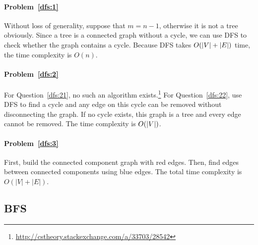 \begin{Answer}

\paragraph{Problem~\ref{dfs:1}}
Without loss of generality, suppose that $m = n-1$, otherwise it is not a tree obviously. Since a tree is a connected graph without a cycle, we can use DFS to check whether the graph contains a cycle. Because DFS takes $O(\lvert V\rvert + \lvert E\rvert)$ time, the time complexity is $O(n)$.

\paragraph{Problem~\ref{dfs:2}}
For Question~\ref{dfs:21}, no such an algorithm exists.\footnote{\url{http://cstheory.stackexchange.com/a/33703/28542}} For Question~\ref{dfs:22}, use DFS to find a cycle and any edge on this cycle can be removed without disconnecting the graph. If no cycle exists, this graph is a tree and every edge cannot be removed. The time complexity is $O(\lvert V\rvert)$.

\paragraph{Problem~\ref{dfs:3}}
First, build the connected component graph with red edges. Then, find edges between connected components using blue edges. The total time complexity is $O(|V| + |E|)$.
\end{Answer}

\subsection{BFS}

